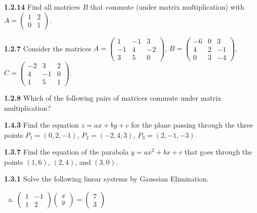 \documentclass{article}
\begin{document}
\textbf{1.2.14} Find all matrices \(B\) that commute (under matrix multiplication) with \(A = \begin{pmatrix} 1 & 2 \\ 0 & 1 \end{pmatrix}\).
\vspace{10pt}

\textbf{1.2.7} Consider the matrices \(A = \begin{pmatrix} 1 & -1 & 3 \\ -1 & 4 & -2 \\ 3 & 5 & 0 \end{pmatrix}\), \(B = \begin{pmatrix} -6 & 0 & 3 \\ 4 & 2 & -1 \\ 0 & 3 & -4 \end{pmatrix}\), \(C = \begin{pmatrix} -2 & 3 & 2 \\ 4 & -1 & 0 \\ 1 & 5 & 1 \end{pmatrix}\).
\vspace{10pt}

\textbf{1.2.8} Which of the following pairs of matrices commute under matrix multiplication?
\vspace{10pt}

\textbf{1.4.3} Find the equation \(z = ax + by + c\) for the plane passing through the three points \(P_1 = (0, 2, -1)\), \(P_2 = (-2, 4, 3)\), \(P_3 = (2, -1, -3)\).
\vspace{10pt}

\textbf{1.3.7} Find the equation of the parabola \(y = ax^2 + bx + c\) that goes through the points \((1, 6)\), \((2, 4)\), and \((3, 0)\).
\vspace{10pt}

\textbf{1.3.1} Solve the following linear systems by Gaussian Elimination.
\begin{enumerate}[(a)]
    \item \(\begin{pmatrix} 1 & -1 \\ 1 & 2 \end{pmatrix} \begin{pmatrix} x \\ y \end{pmatrix} = \begin{pmatrix} 7 \\ 3 \end{pmatrix}\)
\end{enumerate}
\vspace{10pt}

\end{document}
